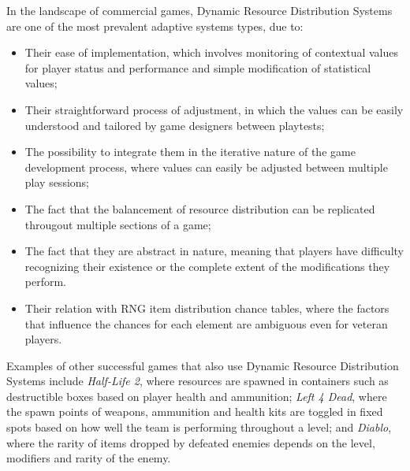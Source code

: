 In the landscape of commercial games, Dynamic Resource Distribution Systems are one of the most prevalent adaptive systems types, due to:
\begin{itemize} 
    \item{Their ease of implementation, which involves monitoring of contextual values for player status and performance and simple modification of statistical values;}
    \item{Their straightforward process of adjustment, in which the values can be easily understood and tailored by game designers between playtests;}
    \item{The possibility to integrate them in the iterative nature of the game development process, where values can easily be adjusted between multiple play sessions;}
    \item{The fact that the balancement of resource distribution can be replicated througout multiple sections of a game;}
    \item{The fact that they are abstract in nature, meaning that players have difficulty recognizing their existence or the complete extent of the modifications they perform.}
    \item{Their relation with RNG item distribution chance tables, where the factors that influence the chances for each element are ambiguous even for veteran players.}
\end{itemize}


Examples of other successful games that also use Dynamic Resource Distribution Systems include \emph{Half-Life 2}, where resources are spawned in containers such as destructible boxes based on player health and ammunition; \emph{Left 4 Dead}, where the spawn points of weapons, ammunition and health kits are toggled in fixed spots based on how well the team is performing throughout a level; and \emph{Diablo}, where the rarity of items dropped by defeated enemies depends on the level, modifiers and rarity of the enemy.

